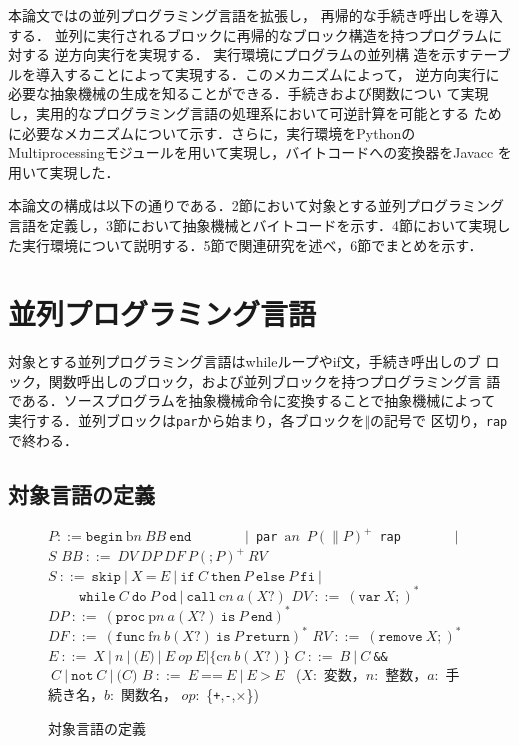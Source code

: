 \documentclass[submit,PRO]{ipsj}
\newcommand{\blabel}[1]{\mathrm{b}#1}
\newcommand{\plabel}[1]{\mathrm{p}#1}
\newcommand{\clabel}[1]{\mathrm{c}#1}
\newcommand{\flabel}[1]{\mathrm{f}#1}
\newcommand{\alabel}[1]{\mathrm{a}#1}
\begin{document}
本論文では\cite{DBLP:conf/rc/IkedaY20}の並列プログラミング言語を拡張し，
再帰的な手続き呼出しを導入する．
並列に実行されるブロックに再帰的なブロック構造を持つプログラムに対する
逆方向実行を実現する．%
実行環境にプログラムの並列構
造を示すテーブルを導入することによって実現する．このメカニズムによって，
逆方向実行に必要な抽象機械の生成を知ることができる．手続きおよび関数につい
て実現し，実用的なプログラミング言語の処理系において可逆計算を可能とする
ために必要なメカニズムについて示す．さらに，実行環境をPythonの
Multiprocessingモジュールを用いて実現し，バイトコードへの変換器をJavacc
を用いて実現した．

本論文の構成は以下の通りである．2節において対象とする並列プログラミング
言語を定義し，3節において抽象機械とバイトコードを示す．4節において実現し
た実行環境について説明する．5節で関連研究を述べ，6節でまとめを示す．

\section{並列プログラミング言語}

対象とする並列プログラミング言語はwhileループやif文，手続き呼出しのブ
ロック，関数呼出しのブロック，および並列ブロックを持つプログラミング言
語である．ソースプログラムを抽象機械命令に変換することで抽象機械によって
実行する．並列ブロックは\texttt{par}から始まり，各ブロックを$\Vert$の記号で
区切り，\texttt{rap}で終わる．

\subsection{対象言語の定義}
\label{sec:3.1}

\begin{figure}[tb]
\vbox{
\hbox{$P ::= \texttt{begin}\ \blabel{n}\ BB\ \texttt{end}$}
\hbox{\ \ \ \ \ \ \ $\vert$ \texttt{par} $\alabel{n}$ $P(\parallel P)^+$ \texttt{rap}}
\hbox{\ \ \ \ \ \ \ $\vert$ $S$}
\hbox{$BB\ ::=\ DV\ DP\ DF\ P(;P)^+\ RV$}
\hbox{$S\ ::=\ \texttt{skip}\ \vert\  X\ \texttt{=}\ E\ \vert\ \texttt{if}\ C\ \texttt{then}\ P\ \texttt{else}\ P\ \texttt{fi}\ \vert$}
\hbox{$\ \ \ \ \ \ \ \ \ \  \texttt{while}\ C\ \texttt{do}\ P\ \texttt{od}\ \vert\ \texttt{call}\ \clabel{n}\ a(X?)$}
\hbox{$DV\ ::=\ (\texttt{var}\ X;)^*$}
\hbox{$DP\ ::=\ (\texttt{proc}\ \plabel{n}\ a(X?)\ \texttt{is}\ P\ \texttt{end})^*$}
\hbox{$DF\ ::=\ (\texttt{func}\ \flabel{n}\ b(X?)\ \texttt{is}\ P\ \texttt{return})^*$}
\hbox{$RV\ ::=\ (\texttt{remove}\ X;)^*$}
\hbox{$E\ ::=\ X\ \vert\ n\ \vert\ \texttt{(}E\texttt{)}\ \vert\ E\ op\ E \vert \{\clabel{n}\ b(X?)\}$}
\hbox{$C\ ::=\ B\ \vert\ C\ $\verb|&&|$ \ C\ \vert\ \texttt{not}\ C\ \vert\ \texttt{(}C\texttt{)}$}
\hbox{$B\ ::=\ E\ \texttt{==}\ E\ \vert \ E\ \texttt{>}\ E$}
\hbox{\\}
\hbox{ ($X$: 変数，$n$: 整数，$a$: 手続き名，$b$: 関数名，}
\hbox{$op$: \{\texttt{+},\texttt{-},$\mathtt{\times}$\})}
}
\centerline{}
\caption{対象言語の定義}
\label{fig:def}
\end{figure}
\end{document}
